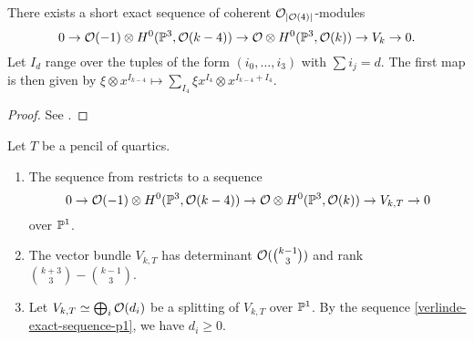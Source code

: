\begin{proposition} \label{verlinde-exact-sequence}
	There exists a short exact sequence of coherent
	$\mathcal{O}_{\lvert\mathcal{O}(4)\rvert}$-modules 
	\[
	0 \to \mathcal{O}(-1) \otimes H^0(\mathbb{P}^3, \mathcal{O}(k-4)) \to \mathcal{O} \otimes H^0(\mathbb{P}^3, \mathcal{O}(k)) \to V_k \to 0.
	\]
	Let $I_d$ range over the tuples of the form
	$(i_0,\dotsc,i_3)$
	with
	$\sum i_j = d$.
	The first map is then given by 
	$\xi \otimes x^{I_{k-4}}
	\mapsto
	\sum_{I_4} \xi x^{I_4} \otimes x^{I_{k-4}+I_4}$.   
	\end{proposition}

\begin{proof}
	See \cite[Proposition 4.2]{hemminghaus-verlinde-bundles}.
\end{proof}

\begin{remark}
	Let $T$ be a pencil of quartics.

	\begin{enumerate}
	\item The sequence from  restricts to a sequence
	\begin{equation} \label{verlinde-exact-sequence-p1}
	0 \to \mathcal{O}(-1) \otimes H^0(\mathbb{P}^3, \mathcal{O}(k-4)) \to \mathcal{O} \otimes H^0(\mathbb{P}^3, \mathcal{O}(k)) \to V_{k,T} \to 0
	\end{equation}
	over $\mathbb{P}^1$.

	\item The vector bundle $V_{k,T}$ has determinant $\mathcal{O}(\binom{k-1}{3})$ and rank $\binom{k+3}{3} - \binom{k-1}{3}$.

	\item Let $V_{k,T} \simeq \bigoplus_i \mathcal{O}(d_i)$ be a splitting of $V_{k,T}$ over $\mathbb{P}^1$. By the sequence \cref{verlinde-exact-sequence-p1}, we have $d_i \geq 0$.
	\end{enumerate}
\end{remark}


